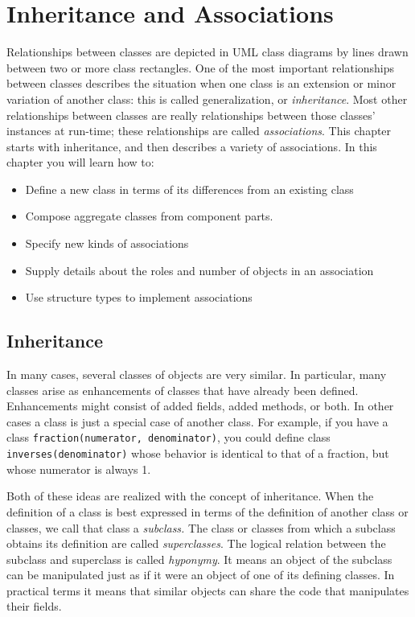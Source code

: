 \chapter{Inheritance and Associations}

Relationships between classes are depicted in UML class diagrams by
lines drawn between two or more class rectangles. One of the most
important relationships between classes describes the situation when
one class is an extension or minor variation of another class: this is
called generalization, or \textit{inheritance}. Most other
relationships between classes are really relationships between those
classes' instances at run-time; these
relationships are called \textit{associations}. This chapter starts
with inheritance, and then describes a variety of associations.
In this chapter you will learn how to:
\begin{itemize}\itemsep0pt
  \item Define a new class in terms of its differences from an existing class
  \item Compose aggregate classes from component parts.
  \item Specify new kinds of associations
  \item Supply details about the roles and number of objects in an association
  \item Use structure types to implement associations
\end{itemize}

\section{Inheritance}

In many cases, several classes of objects are very similar. In
particular, many classes arise as enhancements of classes that have
already been defined. Enhancements might consist of added fields, added
methods, or both. In other cases a class is just a special case of
another class. For example, if you have a class
\texttt{fraction(numerator, denominator)}, you could define class
\texttt{inverses(denominator)} whose behavior is identical to that of a
fraction, but whose numerator is always 1.

Both of these ideas are realized with the concept of
inheritance. When the definition of a class is best
expressed in terms of the definition of another class or classes, we
call that class a \textit{subclass.} The class or
classes from which a subclass obtains its definition are called
\textit{superclass}\textit{es}. The logical relation
between the subclass and superclass is called \textit{hyponymy}. It
means an object of the subclass can be manipulated just as if it were
an object of one of its defining classes. In practical terms it means
that similar objects can share the code that manipulates their fields.

